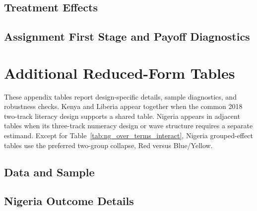 \documentclass[11pt]{article}
\begin{document}
\subsection*{Treatment Effects}





\subsection*{Assignment First Stage and Payoff Diagnostics}




\clearpage
\appendix
\setcounter{table}{0}
\setcounter{figure}{0}
\renewcommand{\thetable}{A\arabic{table}}
\renewcommand{\thefigure}{A\arabic{figure}}

\section{Additional Reduced-Form Tables}
\label{app:rf_tables}

\noindent These appendix tables report design-specific details, sample diagnostics, and robustness checks. Kenya and Liberia appear together when the common 2018 two-track literacy design supports a shared table. Nigeria appears in adjacent tables when its three-track numeracy design or wave structure requires a separate estimand. Except for Table~\ref{tab:ng_over_terms_interact}, Nigeria grouped-effect tables use the preferred two-group collapse, Red versus Blue/Yellow.

\subsection{Data and Sample}











\subsection{Nigeria Outcome Details}




\end{document}
